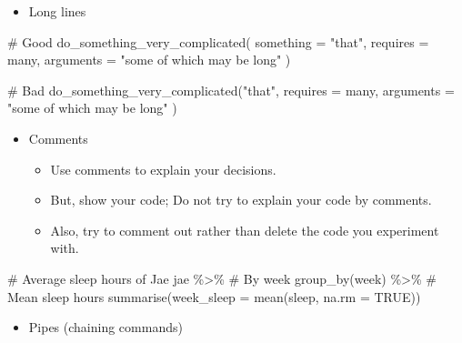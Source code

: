 \documentclass[
  letterpaper,
  DIV=11,
  numbers=noendperiod]{scrreprt}
\newenvironment{Shaded}{\begin{snugshade}}{\end{snugshade}}
\newcommand{\AttributeTok}[1]{\textcolor[rgb]{0.40,0.45,0.13}{#1}}
\newcommand{\CommentTok}[1]{\textcolor[rgb]{0.37,0.37,0.37}{#1}}
\newcommand{\ConstantTok}[1]{\textcolor[rgb]{0.56,0.35,0.01}{#1}}
\newcommand{\FunctionTok}[1]{\textcolor[rgb]{0.28,0.35,0.67}{#1}}
\newcommand{\NormalTok}[1]{\textcolor[rgb]{0.00,0.23,0.31}{#1}}
\newcommand{\SpecialCharTok}[1]{\textcolor[rgb]{0.37,0.37,0.37}{#1}}
\newcommand{\StringTok}[1]{\textcolor[rgb]{0.13,0.47,0.30}{#1}}
\providecommand{\tightlist}{%
  \setlength{\itemsep}{0pt}\setlength{\parskip}{0pt}}\usepackage{longtable,booktabs,array}
\begin{document}
\begin{itemize}
\tightlist
\item
  Long lines
\end{itemize}

\begin{Shaded}
\begin{Highlighting}[]
\CommentTok{\# Good}
\FunctionTok{do\_something\_very\_complicated}\NormalTok{(}
  \AttributeTok{something =} \StringTok{"that"}\NormalTok{,}
  \AttributeTok{requires =}\NormalTok{ many,}
  \AttributeTok{arguments =} \StringTok{"some of which may be long"}
\NormalTok{)}

\CommentTok{\# Bad}
\FunctionTok{do\_something\_very\_complicated}\NormalTok{(}\StringTok{"that"}\NormalTok{, }\AttributeTok{requires =}\NormalTok{ many, }\AttributeTok{arguments =}
                              \StringTok{"some of which may be long"}
\NormalTok{                              )}
\end{Highlighting}
\end{Shaded}

\begin{itemize}
\tightlist
\item
  Comments

  \begin{itemize}
  \tightlist
  \item
    Use comments to explain your decisions.
  \item
    But, show your code; Do not try to explain your code by comments.
  \item
    Also, try to comment out rather than delete the code you experiment
    with.
  \end{itemize}
\end{itemize}

\begin{Shaded}
\begin{Highlighting}[]
\CommentTok{\# Average sleep hours of Jae}
\NormalTok{jae }\SpecialCharTok{\%\textgreater{}\%}
  \CommentTok{\# By week}
  \FunctionTok{group\_by}\NormalTok{(week) }\SpecialCharTok{\%\textgreater{}\%}
  \CommentTok{\# Mean sleep hours }
  \FunctionTok{summarise}\NormalTok{(}\AttributeTok{week\_sleep =} \FunctionTok{mean}\NormalTok{(sleep, }\AttributeTok{na.rm =} \ConstantTok{TRUE}\NormalTok{))}
\end{Highlighting}
\end{Shaded}

\begin{itemize}
\tightlist
\item
  Pipes (chaining commands)
\end{itemize}
\end{document}
